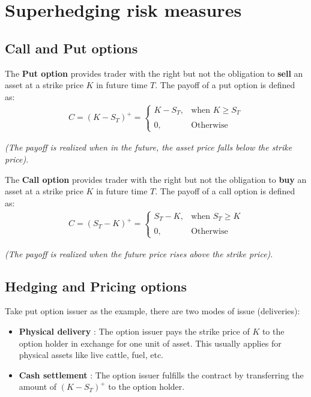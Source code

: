 \newpage 
\section{Superhedging risk measures}
\subsection{Call and Put options}
\begin{definition}
    The \textbf{Put option} provides trader with the right but not the obligation to \textbf{sell} an asset at a strike price $K$ in future time $T$. The payoff of a put option is defined as:
    \begin{align*}
        C = (K - S_T)^+ = \begin{cases}
            K - S_T, & \text{when } K \ge S_T 
            \\ \\
            0, & \text{Otherwise}
        \end{cases} 
    \end{align*}

    \noindent \textit{(The payoff is realized when in the future, the asset price falls below the strike price)}.
\end{definition}


\begin{definition}
    The \textbf{Call option} provides trader with the right but not the obligation to \textbf{buy} an asset at a strike price $K$ in future time $T$. The payoff of a call option is defined as:
    \begin{align*}
        C = (S_T - K)^+ = \begin{cases}
            S_T - K, &\text{when } S_T \ge K 
            \\ \\
            0, &\text{Otherwise}
        \end{cases}
    \end{align*}

    \textit{(The payoff is realized when the future price rises above the strike price)}.
\end{definition}

\subsection{Hedging and Pricing options}
\begin{definition}
    Take put option issuer as the example, there are two modes of issue (deliveries):
    \begin{itemize}
        \item \textbf{Physical delivery} : The option issuer pays the strike price of $K$ to the option holder in exchange for one unit of asset. This usually applies for physical assets like live cattle, fuel, etc.
        \item \textbf{Cash settlement} : The option issuer fulfills the contract by transferring the amount of $(K-S_T)^+$ to the option holder.
    \end{itemize}
\end{definition}

